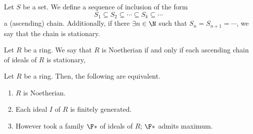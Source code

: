 \documentclass{subfiles}
\begin{document}
    \begin{definition*}
        Let \(S\) be a set. We define a sequence of inclusion of the form
            \[
                S_{1} \subseteq S_{2} \subseteq \cdots \subseteq S_{k} \subseteq \cdots
            \]
            a (ascending) chain. Additionally, if there \(\exists n \in \N\) such 
            that \(S_{n} = S_{n + 1} = \cdots\), we say that the chain is stationary.
    \end{definition*}

    \begin{definition*}
        Let \(R\) be a ring. We say that \(R\) is Noetherian if and only if 
            each ascending chain of ideals of \(R\) is stationary,
    \end{definition*}

    \begin{proposition*}
        Let \(R\) be a ring. Then, the following are equivalent.
        \begin{enumerate}
            \item \label{enm:1}  \(R\) is Noetherian.
            \item \label{enm:2} Each ideal \(I\) of \(R\) is finitely generated.
            \item \label{enm:3} However took a family \(\F*\) of ideals of \(R\); 
                \(\F*\) admits maximum. 
        \end{enumerate}
    \end{proposition*}
\end{document}
